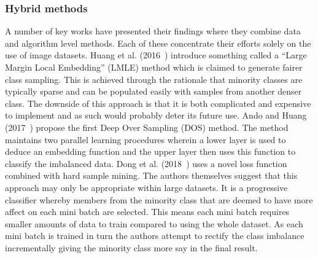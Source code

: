 \subsubsection{Hybrid methods}\label{subsec:DeepLearningHybridMethods}
A number of key works have presented their findings where they combine data and algorithm level methods. Each of these concentrate their efforts solely on the use of image datasets. Huang et al. (2016~\cite{huang2016learning}) introduce something called a ``Large Margin Local Embedding'' (LMLE) method which is claimed to generate fairer class sampling. This is achieved through the rationale that minority classes are typically sparse and can be populated easily with samples from another denser class. The downside of this approach is that it is both complicated and expensive to implement and as such would probably deter its future use. Ando and Huang (2017~\cite{ando2017deep}) propose the first Deep Over Sampling (DOS) method. The method maintains two parallel learning procedures wherein a lower layer is used to deduce an embedding function and the upper layer then uses this function to classify the imbalanced data. Dong et al. (2018~\cite{dong2018imbalanced}) uses a novel loss function combined with hard sample mining. The authors themselves suggest that this approach may only be appropriate within large datasets. It is a progressive classifier whereby members from the minority class that are deemed to have more affect on each mini batch are selected. This means each mini batch requires smaller amounts of data to train compared to using the whole dataset. As each mini batch is trained in turn the authors attempt to rectify the class imbalance incrementally giving the minority class more say in the final result.


